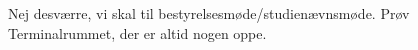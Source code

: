 \documentclass[a4paper,11pt]{article}
\begin{document}
\begin{sketch}
{\begin{enumerate}
    Nej desværre, vi skal til bestyrelsesmøde/studienævnsmøde.  Prøv
    Terminalrummet, der er altid nogen oppe.
\end{enumerate}
}

\end{sketch}
\end{document}
